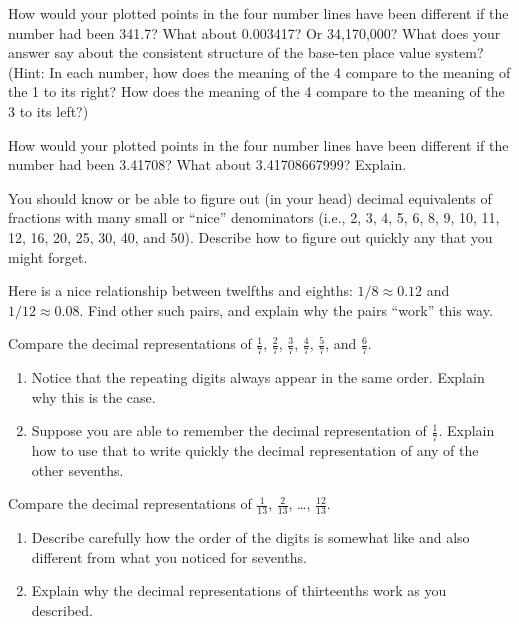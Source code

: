 \documentclass[nooutcomes]{ximera}
\begin{document}
\begin{problem}
How would your plotted points in the four number lines have been different if the number had been 341.7?  What about 0.003417?  Or 34,170,000?   What does your answer say about the consistent structure of the base-ten place value system?  (Hint:  In each number, how does the meaning of the 4 compare to the meaning of the 1 to its right?   How does the meaning of the 4 compare to the meaning of the 3 to its left?)  

\end{problem}

\begin{problem}
How would your plotted points in the four number lines have been different if the number had been 3.41708?  What about 3.41708667999?  Explain.  

\end{problem}

\begin{problem}
You should know or be able to figure out (in your head) decimal equivalents of fractions with many small  or ``nice'' denominators (i.e., 2, 3, 4, 5, 6, 8, 9, 10, 11, 12, 16, 20, 25, 30, 40, and 50).  Describe how to figure out quickly any that you might forget.  

\end{problem}

\begin{problem}
Here is a nice relationship between twelfths and eighths:  $1/8\approx 0.12$ and $1/12\approx 0.08$.  Find other such pairs, and explain why the pairs ``work'' this way.   

\end{problem}

\begin{problem}
Compare the decimal representations of $\frac{1}{7}$, $\frac{2}{7}$, $\frac{3}{7}$, $\frac{4}{7}$, $\frac{5}{7}$, and  $\frac{6}{7}$.
\begin{enumerate}  
\item Notice that the repeating digits always appear in the same order.  Explain why this is the case.
\item Suppose you are able to remember the decimal representation of $\frac{1}{7}$.  Explain how to use that to write quickly the decimal representation of any of the other sevenths.  
\end{enumerate}
\end{problem}

\begin{problem}
Compare the decimal representations of $\frac{1}{13}$, $\frac{2}{13}$, \dots,  $\frac{12}{13}$.  
\begin{enumerate}  
\item Describe carefully how the order of the digits is somewhat like and also different from what you noticed for sevenths.  
\item Explain why the decimal representations of thirteenths work as you described.
\end{enumerate}
\end{problem}
\end{document}
